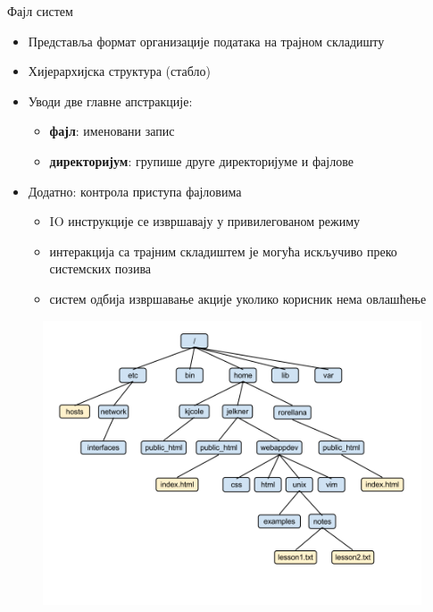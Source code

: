 \documentclass[xcolor=table]{beamer}
\begin{document}
    \begin{frame}[allowframebreaks]{Фајл систем}
        \begin{itemize}
            \item Представља формат организације података на трајном складишту
            \item Хијерархијска структура (стабло)
            \item Уводи две главне апстракције:
            \begin{itemize}
                \item \textbf{фајл}: именовани запис
                \item \textbf{директоријум}: групише друге директоријуме и фајлове
            \end{itemize}
            \item Додатно: контрола приступа фајловима
            \begin{itemize}
                \item IO инструкције се извршавају у привилегованом режиму
                \item интеракција са трајним складиштем је могућа искључиво преко системских позива
                \item систем одбија извршавање акције уколико корисник нема овлашћење
            \end{itemize}
        \end{itemize}
        
        \framebreak
        
        \begin{figure}
            \centering
            \includegraphics[width=\textwidth,height=0.8\textheight,keepaspectratio]{images/UnixDirectoryTree.png}
            \label{fig:UnixDirectoryTree.png}
        \end{figure}
    \end{frame}
    
\end{document}
